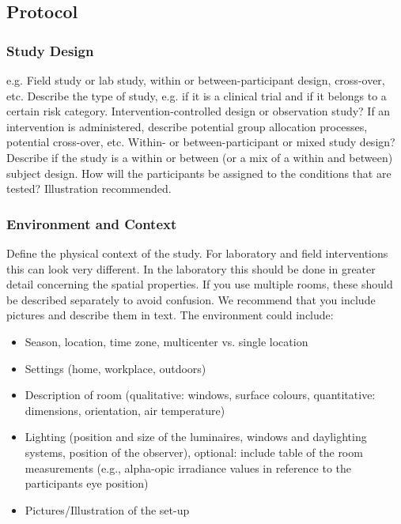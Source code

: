 \subsection{Protocol}
\subsubsection{Study Design}
\begin{prereg}
\begin{instruction}
e.g. Field study or lab study, within or between-participant design, cross-over, etc.
Describe the type of study, e.g. if it is a clinical trial and if it belongs to a certain risk category.
Intervention-controlled design or observation study? If an intervention is administered, describe potential group allocation processes, potential cross-over, etc. 
Within- or between-participant or mixed study design? Describe if the study is a within or between (or a mix of a within and between) subject design. How will the participants be assigned to the conditions that are tested? 
Illustration recommended.
\end{instruction}
\end{prereg}




\subsubsection{Environment and Context}
\begin{prereg}
\begin{instruction}
Define the physical context of the study. For laboratory and field interventions this can look very different. In the laboratory this should be done in greater detail concerning the spatial properties. If you use multiple rooms, these should be described separately to avoid confusion. We recommend that you include pictures and describe them in text. The environment could include: 
\begin{itemize}
    \item Season, location, time zone, multicenter vs. single location
    \item Settings (home, workplace, outdoors)
    \item Description of room (qualitative: windows, surface colours, quantitative: dimensions, orientation, air temperature)
    \item Lighting (position and size of the luminaires, windows and daylighting systems, position of the observer), optional: include table of the room measurements (e.g., alpha-opic irradiance values in reference to the participants eye position)
    \item Pictures/Illustration of the set-up
\end{itemize}
\end{instruction}
\end{prereg}



